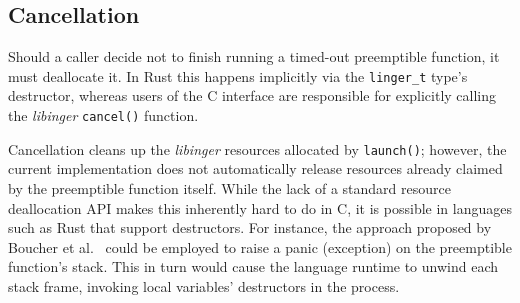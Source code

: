 

\subsection{Cancellation}

Should a caller decide not to finish running a timed-out preemptible function, it
must deallocate it.  In Rust this happens implicitly via the \texttt{linger\_t}
type's destructor, whereas users of the C interface are responsible for explicitly
calling the \textit{libinger} \texttt{cancel()} function.

Cancellation cleans up the \textit{libinger} resources allocated by
\texttt{launch()};
however, the current implementation
does not automatically release resources already claimed by the
preemptible function itself.  While the lack of a standard resource deallocation API
makes this inherently hard to do in C, it is possible in languages
such as Rust that support destructors.  For instance, the approach proposed by
Boucher et al.~\cite{boucher:atc2018} could be employed to raise a panic
(exception) on the preemptible function's stack.  This in turn would cause the
language runtime
to unwind each stack frame, invoking local variables' destructors in
the process.

